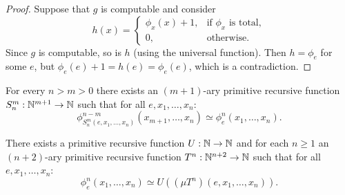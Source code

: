 \begin{proof}
  Suppose that $g$ is computable and consider
  \[
	h(x) =
	\begin{cases}
	  \phi_x(x) + 1, & \text{if $\phi_x$ is total}, \\
	  0, & \text{otherwise}.
	\end{cases}
  \]
  Since $g$ is computable, so is $h$ (using the universal function).
  Then $h = \phi_e$ for some $e$, but $\phi_e(e) + 1 = h(e) = \phi_e(e)$, which
  is a contradiction.
\end{proof}

\begin{theorem}[S-M-N]
  For every $n > m > 0$ there exists an $(m+1)$-ary primitive recursive function
  $S_n^m: \mathbb{N}^{m+1} \to \mathbb{N}$ such that for all $e, x_1, \ldots, x_n$:
  \[
	\phi_{S_n^m(e, x_1, \ldots, x_n)}^{n-m} (x_{m+1}, \ldots, x_n)
	\simeq \phi_e^n(x_1, \ldots, x_n).
  \]
\end{theorem}

\begin{theorem}
  There exists a primitive recursive function $U: \mathbb{N} \to \mathbb{N}$ and for each $n \ge
  1$ an $(n+2)$-ary primitive recursive function $T^n: \mathbb{N}^{n+2} \to \mathbb{N}$ such
  that for all $e, x_1, \ldots, x_n$:
  \[
	\phi_e^n(x_1, \ldots, x_n) \simeq U((\mu T^n)(e, x_1, \ldots, x_n)).
  \]
\end{theorem}